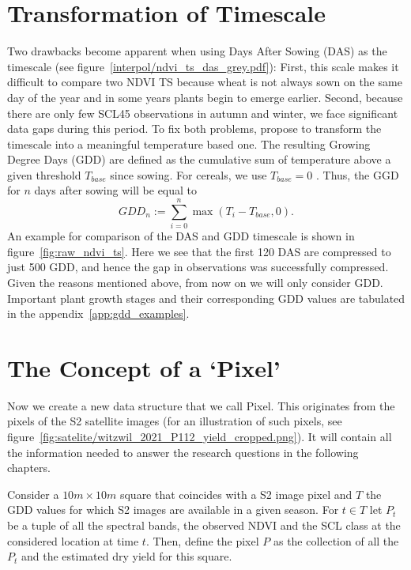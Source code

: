 \section{Transformation of Timescale}\label{sec:gdd_def}
	{%
		Two drawbacks become apparent when using Days After Sowing (DAS) as the timescale (see figure~\ref{interpol/ndvi_ts_das_grey.pdf}): First, this scale makes it difficult to compare two NDVI {TS} because wheat is not always sown on the same day of the year and in some years plants begin to emerge earlier. Second, because there are only few SCL45 observations in autumn and winter, we face significant data gaps during this period. To fix both problems, \cite{mcmasterGrowingDegreedaysOne1997} propose to transform the timescale into a meaningful temperature based one. The resulting Growing Degree Days ({GDD}) are defined as the cumulative sum of temperature above a given threshold $T_{base}$ since sowing. For cereals, we use $T_{base}=0$ \citep{holzkamperSpatialTemporalTrends2015}. Thus, the GGD for $n$ days after sowing will be equal to
		\begin{equation}
			\label{eq:gdd}
			GDD_n := \sum_{i=0}^n \max(T_i - T_{base}, 0).
		\end{equation}
        An example for comparison of the DAS and GDD timescale is shown in figure~\ref{fig:raw_ndvi_ts}. Here we see that the first 120 DAS are compressed to just 500 GDD, and hence the gap in observations was successfully compressed. Given the reasons mentioned above, from now on we will only consider GDD. 
        Important plant growth stages and their corresponding GDD values are tabulated in the appendix~\ref{app:gdd_examples}.
	} 

\section{The Concept of a `Pixel'}{ \label{sec:gather_data_to_pixel}
	Now we create a new data structure that we call Pixel. This originates from the pixels of the S2 satellite images (for an illustration of such pixels, see figure~\ref{fig:satelite/witzwil_2021_P112_yield_cropped.png}). It will contain all the information needed to answer the research questions in the following chapters. 
		
		Consider a $10m\times 10m$ square that coincides with a S2 image pixel and $T$ the GDD values for which S2 images are available in a given season. For $t\in T$ let $P_t$ be a tuple of all the spectral bands, the observed NDVI and the SCL class at the considered location at time $t$. Then, define the pixel $P$ as the collection of all the $P_t$ and the estimated dry yield for this square.
}

